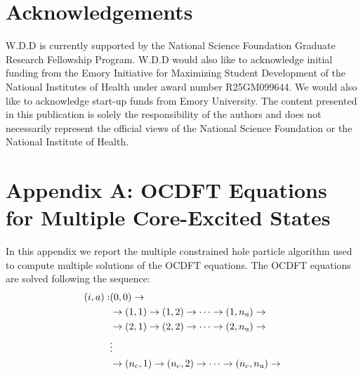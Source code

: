 \documentclass[12pt]{article}
\begin{document}
\section{Acknowledgements}
W.D.D is currently supported by the National Science Foundation Graduate Research Fellowship Program. W.D.D would also like to acknowledge initial funding from the Emory Initiative for Maximizing Student Development of the National Institutes of Health under award number R25GM099644. We would also like to acknowledge start-up funds from Emory University. The content presented in this publication is solely the responsibility of the authors and does not necessarily represent the official views of the National Science Foundation or the National Institute of Health.\\

%
%
\appendix
\renewcommand{\theequation}{A\arabic{equation}}
\section*{Appendix A: OCDFT Equations for Multiple Core-Excited States}
In this appendix we report the multiple constrained hole particle algorithm used to compute multiple solutions of the OCDFT equations.
The OCDFT equations are solved following the sequence:
\begin{equation}
\begin{split}
(i,a) : &(0,0) \rightarrow \\
        &\rightarrow (1,1) \rightarrow (1,2) \rightarrow \cdots \rightarrow (1,n_{\rm u})  \rightarrow\\
        &\rightarrow  (2,1) \rightarrow (2,2) \rightarrow \cdots \rightarrow (2,n_{\rm u})  \rightarrow\\
        & \vdots\\
        &\rightarrow  (n_{\rm c},1) \rightarrow (n_{\rm c},2) \rightarrow \cdots \rightarrow (n_{\rm c},n_{\rm u})  \rightarrow
\end{split}
\end{equation}
\end{document}
